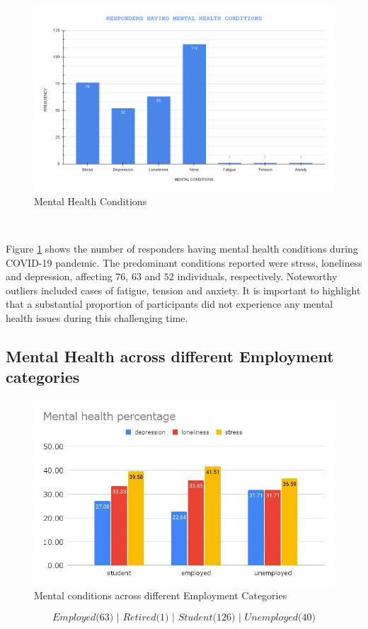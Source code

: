 \begin{figure}[h!]
	\centering
	\includegraphics[width=0.9\linewidth]{IMAGES/Image 12.png}
	\caption{Mental Health Conditions}
	\label{G12}
\end{figure}

\

Figure \ref{G12} shows the number of responders having mental health conditions during COVID-19 pandemic. The predominant conditions reported were stress, loneliness and depression, affecting $76$, $63$ and $52$ individuals, respectively. Noteworthy outliers included cases of fatigue, tension and anxiety. It is important to highlight that a substantial proportion of participants did not experience any mental health issues during this challenging time.

\newpage

\subsection{Mental Health across different Employment categories}

\begin{figure}[h!]
	\centering
	\includegraphics[width=0.9\linewidth]{IMAGES/Image 11.jpeg}
	\caption{Mental conditions across different Employment Categories}
	\label{G11}
\end{figure}
$$\textit{Employed($63$) | Retired($1$) | Student($126$) | Unemployed($40$)}$$

